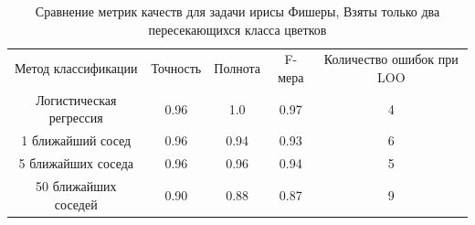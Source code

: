 \begin{table}[ht]
\caption{Сравнение метрик качеств для задачи ирисы Фишеры,
Взяты только два пересекающихся класса цветков}
\label{tab_weight}
\centering
    \begin{tabular}{|c|c|c|c|c|}
    \hline \multirow{3}{*}{\parbox{3.5cm}{Метод классификации}} & \multirow{3}{*}{Точность} & \multirow{3}{*}{Полнота} & \multirow{3}{*}{F-мера}  & \multirow{3}{*}{\parbox{3cm}{Количество ошибок при LOO}} \\
    & & & & \\
    & & & & \\    
    \hline \multirow{2}{*}{\parbox{3.5cm}{Логистическая регрессия}} & \multirow{2}{*}{0.96} & \multirow{2}{*}{1.0} & \multirow{2}{*}{0.97}  & \multirow{2}{*}{4} \\
    & & & & \\    
    \hline \multirow{2}{*}{\parbox{3.5cm}{1 ближайший сосед}} & \multirow{2}{*}{0.96} & \multirow{2}{*}{0.94} & \multirow{2}{*}{0.93}  & \multirow{2}{*}{6} \\
    & & & & \\ 
    \hline \multirow{2}{*}{\parbox{3.5cm}{5 ближайших соседа}} & \multirow{2}{*}{0.96} & \multirow{2}{*}{0.96} & \multirow{2}{*}{0.94}  & \multirow{2}{*}{5} \\
    & & & & \\ 
    \hline \multirow{2}{*}{\parbox{3.5cm}{50 ближайших соседей}} & \multirow{2}{*}{0.90} & \multirow{2}{*}{0.88} & \multirow{2}{*}{0.87}  & \multirow{2}{*}{9} \\
    & & & & \\     
    \hline
    \end{tabular}
\end{table}